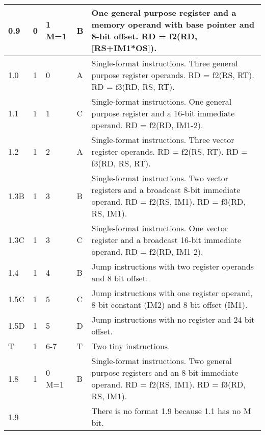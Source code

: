 \documentclass[forwardcom.tex]{subfiles}
\begin{document}
\begin{longtable} {|p{10mm}|p{6mm}|p{9mm}|p{7mm}|p{80mm}|}
\hline
0.9 & 0 & 1 M=1 & B & One general purpose register and a memory operand with base pointer and 8-bit offset. \newline
RD = f2(RD, [RS+IM1*OS]).\\

\hline
1.0 & 1 & 0 & A & Single-format instructions. Three general purpose register operands. \newline 
RD = f2(RS, RT). RD = f3(RD, RS, RT).\\

\hline
1.1 & 1 & 1 & C & Single-format instructions. One general purpose register and a 16-bit immediate operand. \newline 
RD = f2(RD, IM1-2).\\

\hline
1.2 & 1 & 2 & A & Single-format instructions. Three vector register operands. \newline 
RD = f2(RS, RT). RD = f3(RD, RS, RT).\\

\hline
1.3B & 1 & 3 & B & Single-format instructions. Two vector registers and a broadcast 8-bit immediate operand. \newline 
RD = f2(RS, IM1). RD = f3(RD, RS, IM1). \\

\hline
1.3C & 1 & 3 & C & Single-format instructions. One vector register and a broadcast 16-bit immediate operand. \newline 
RD = f2(RD, IM1-2). \\

\hline
1.4 & 1 & 4 & B & Jump instructions with two register operands and 8 bit offset.\\

\hline
1.5C & 1 & 5 & C & Jump instructions with one register operand, 8 bit constant (IM2) and 8 bit offset (IM1).\\

\hline
1.5D & 1 & 5 & D & Jump instructions with no register and 24 bit offset.  \\

\hline
T & 1 & 6-7 & T & Two tiny instructions.\\

\hline
1.8 & 1 & 0 M=1 & B & Single-format instructions. Two general purpose registers and an 8-bit immediate operand.\newline 
RD = f2(RS, IM1). RD = f3(RD, RS, IM1).\\

\hline
1.9 &  &  &  & There is no format 1.9 because 1.1 has no M bit.\\


\end{longtable}
\end{document}
